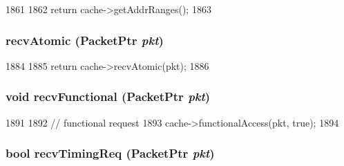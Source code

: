 \begin{DoxyCode}
1861 {
1862     return cache->getAddrRanges();
1863 }
\end{DoxyCode}
\hypertarget{classCache_1_1CpuSidePort_a5f0b4c4a94f6b0053f9d7a4eb9c2518a}{
\subsubsection[{recvAtomic}]{ recvAtomic ({\bf PacketPtr} {\em pkt})}}
\label{classCache_1_1CpuSidePort_a5f0b4c4a94f6b0053f9d7a4eb9c2518a}



\begin{DoxyCode}
1884 {
1885     return cache->recvAtomic(pkt);
1886 }
\end{DoxyCode}
\hypertarget{classCache_1_1CpuSidePort_aeefa907fb6d6a787e6dab90e8138ea90}{
\subsubsection[{recvFunctional}]{\setlength{\rightskip}{0pt plus 5cm}void recvFunctional ({\bf PacketPtr} {\em pkt})}}
\label{classCache_1_1CpuSidePort_aeefa907fb6d6a787e6dab90e8138ea90}



\begin{DoxyCode}
1891 {
1892     // functional request
1893     cache->functionalAccess(pkt, true);
1894 }
\end{DoxyCode}
\hypertarget{classCache_1_1CpuSidePort_a3344d9dd0f83257feab5424e761f31c6}{
\subsubsection[{recvTimingReq}]{\setlength{\rightskip}{0pt plus 5cm}bool recvTimingReq ({\bf PacketPtr} {\em pkt})}}
\label{classCache_1_1CpuSidePort_a3344d9dd0f83257feab5424e761f31c6}



